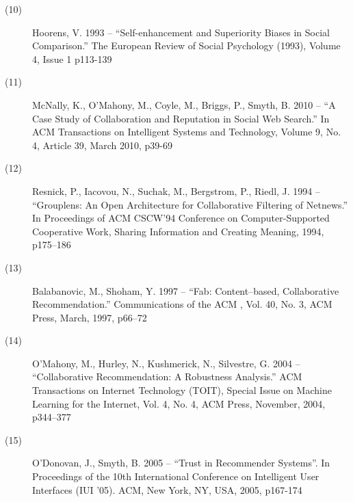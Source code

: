 \documentclass[]{final_report}
\begin{document}
\begin{description}
\item[(10)] Hoorens, V. 1993 -- ``Self-enhancement and Superiority Biases in Social Comparison.'' The European Review of Social Psychology (1993), Volume 4, Issue 1 p113-139


\item[(11)] McNally, K., O'Mahony, M., Coyle, M., Briggs, P., Smyth, B. 2010 -- ``A Case Study of Collaboration and Reputation in Social Web Search.'' In ACM Transactions on Intelligent Systems and Technology, Volume 9, No. 4, Article 39, March 2010, p39-69

\item[(12)] Resnick, P., Iacovou, N., Suchak, M., Bergstrom, P., Riedl, J. 1994 -- ``Grouplens: An Open Architecture for Collaborative Filtering of Netnews.'' In Proceedings of ACM CSCW’94 Conference on Computer-Supported Cooperative Work, Sharing Information and Creating Meaning, 1994, p175–186

\item[(13)] Balabanovic, M., Shoham, Y. 1997 -- ``Fab: Content–based, Collaborative Recommendation.'' Communications of the ACM , Vol. 40, No. 3, ACM Press, March, 1997, p66–72

\item[(14)] O’Mahony, M., Hurley, N., Kushmerick, N., Silvestre, G. 2004 -- ``Collaborative Recommendation: A Robustness Analysis.'' ACM Transactions on Internet Technology (TOIT), Special Issue on Machine Learning for the Internet, Vol. 4, No. 4, ACM Press, November, 2004, p344–377

\item[(15)] O'Donovan, J., Smyth, B. 2005 -- ``Trust in Recommender Systems''. In Proceedings of the 10th International Conference on Intelligent User Interfaces (IUI '05). ACM, New York, NY, USA, 2005, p167-174

\end{description}




\label{endpage}
\end{document}
